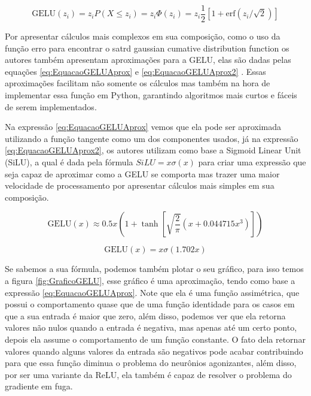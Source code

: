 \begin{equation}
    \text{GELU}(z_i) = z_i P(X \leqslant z_i) = z_i \Phi (z_i) = z_i \frac{1}{2} \left[ 1 + \text{erf} (z_i/ \sqrt{2}) \right]
    \label{eq:EquacaoGELU}
\end{equation}

Por apresentar cálculos mais complexos em sua composição, como o uso da função erro para encontrar o satrd gaussian cumative distribution function os autores também apresentam aproximações para a GELU, elas são dadas pelas equações \ref{eq:EquacaoGELUAprox} e \ref{eq:EquacaoGELUAprox2} \parencite{gelu}. Essas aproximações facilitam não somente os cálculos mas também na hora de implementar essa função em Python, garantindo algoritmos mais curtos e fáceis de serem implementados.

Na expressão \ref{eq:EquacaoGELUAprox} vemos que ela pode ser aproximada utilizando a função tangente como um dos componentes usados, já na expressão \ref{eq:EquacaoGELUAprox2}, os autores utilizam como base a Sigmoid Linear Unit (SiLU), a qual é dada pela fórmula $SiLU = x\sigma(x)$ para criar uma expressão que seja capaz de aproximar como a GELU se comporta mas trazer uma maior velocidade de processamento por apresentar cálculos mais simples em sua composição.

\begin{equation}
    \text{GELU}(x) \approx 0.5x \left(1 + \tanh\left[\sqrt{\frac{2}{\pi}} \left(x + 0.044715x^3\right)\right]\right)
    \label{eq:EquacaoGELUAprox}
\end{equation}

\begin{equation}
    \text{GELU}(x) = x \sigma(1.702x)
    \label{eq:EquacaoGELUAprox2}
\end{equation}

Se sabemos a sua fórmula, podemos também plotar o seu gráfico, para isso temos a figura \ref{fig:GraficoGELU}, esse gráfico é uma aproximação, tendo como base a expressão \ref{eq:EquacaoGELUAprox}. Note que ela é uma função assimétrica, que possui o comportamento quase que de uma função identidade para os casos em que a sua entrada é maior que zero, além disso, podemos ver que ela retorna valores não nulos quando a entrada é negativa, mas apenas até um certo ponto, depois ela assume o comportamento de um função constante. O fato dela retornar valores quando alguns valores da entrada são negativos pode acabar contribuindo para que essa função diminua o problema do neurônios agonizantes, além disso, por ser uma variante da ReLU, ela também é capaz de resolver o problema do gradiente em fuga.

